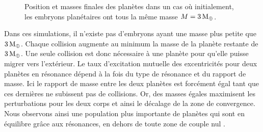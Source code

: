 \begin{figure}[htbp]
\centering
{}\hfill
{}

\caption{Position et masses finales des planètes dans un cas où initialement, les embryons planétaires ont tous la même masse
$M=3\mathrm{\thinspace M_\oplus}$.}\label{fig:HSE_equal_mass_influence}
\end{figure}

Dans ces simulations, il n'existe pas d'embryons ayant une masse plus petite que $3\mathrm{\thinspace M_\oplus}$. Chaque collision augmente au minimum la masse de la planète restante de $3\mathrm{\thinspace M_\oplus}$. Une seule collision est donc nécessaire à une planète pour qu'elle puisse migrer vers l'extérieur. Le taux d'excitation mutuelle des excentricités pour deux planètes en résonance dépend à la fois du type de résonance et du rapport de masse. Ici le rapport de masse entre les deux planètes est forcément égal tant que ces dernières ne subissent pas de collisions. Or, des masses égales maximisent les perturbations pour les deux corps et ainsi le décalage de la zone de convergence. Nous observons ainsi une population plus importante de planètes qui sont en équilibre grâce aux résonances, en dehors de toute zone de couple nul . 

